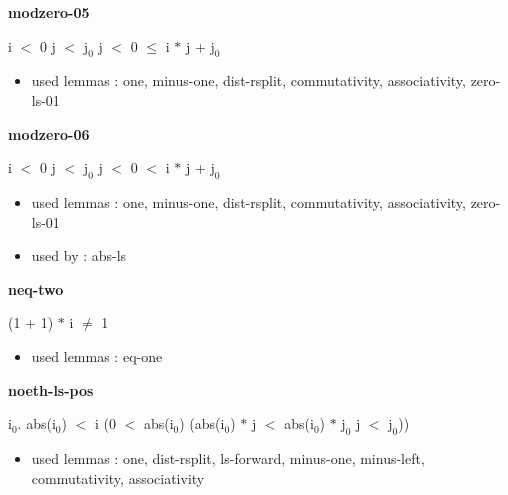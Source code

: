 \documentclass[a4paper]{article}
\begin{document}
\medskip

\bigskip

{\large\bf modzero-05}

\medskip

 \Fol i $<$ 0 \And j $<$ $\mbox{j}_{0}$ \And j $<$ 0  $\le$ i $*$ j + $\mbox{j}_{0}$

\begin{itemize}


\item       used lemmas  : one, minus-one, dist-rsplit, commutativity, associativity, zero-ls-01

\end{itemize}

\medskip

\bigskip

{\large\bf modzero-06}

\medskip

 \Fol i $<$ 0 \And j $<$ $\mbox{j}_{0}$ \And j $<$ 0  $<$ i $*$ j + $\mbox{j}_{0}$

\begin{itemize}


\item       used lemmas  : one, minus-one, dist-rsplit, commutativity, associativity, zero-ls-01
\item       used by      : abs-ls

\end{itemize}

\medskip

\bigskip

{\large\bf neq-two}

\medskip

 \Fol (1 + 1) $*$ i $\neq$ 1

\begin{itemize}


\item       used lemmas  : eq-one

\end{itemize}

\medskip

\bigskip

{\large\bf noeth-ls-pos}

\medskip

 \Fol \All $\mbox{i}_{0}$. abs($\mbox{i}_{0}$) $<$ i \Imp (0 $<$ abs($\mbox{i}_{0}$) \Imp (abs($\mbox{i}_{0}$) $*$ j $<$ abs($\mbox{i}_{0}$) $*$ $\mbox{j}_{0}$ \Equiv j $<$ $\mbox{j}_{0}$))

\begin{itemize}


\item       used lemmas  : one, dist-rsplit, ls-forward, minus-one, minus-left, commutativity, associativity

\end{itemize}
\end{document}
